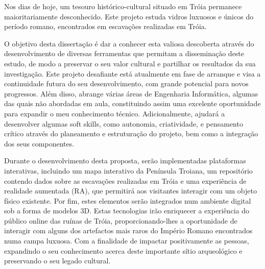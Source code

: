 
%

Nos dias de hoje, um tesouro histórico-cultural situado em Tróia permanece maioritariamente desconhecido.  
Este projeto estuda vidros luxuosos e únicos do período romano, encontrados em escavações realizadas em Tróia.


O objetivo desta dissertação é dar a conhecer esta valiosa descoberta através do desenvolvimento de diversas ferramentas que permitam a disseminação deste estudo, de modo a preservar o seu valor cultural e partilhar os resultados da sua investigação. 
Este projeto desafiante está atualmente em fase de arranque e visa a continuidade futura do seu desenvolvimento, com grande potencial para novos progressos.
Além disso, abrange várias áreas de Engenharia Informática, algumas das quais não abordadas em aula, constituindo assim uma excelente oportunidade para expandir o meu conhecimento técnico. 
Adicionalmente, ajudará a desenvolver algumas soft skills, como autonomia, criatividade, e pensamento crítico através do planeamento e estruturação do projeto, bem como a integração dos seus componentes. 


Durante o desenvolvimento desta proposta, serão implementadas plataformas interativas, incluindo um mapa interativo da Península Troiana, um repositório contendo dados sobre as escavações realizadas em Tróia e uma experiência de realidade aumentada (RA), que permitirá aos visitantes interagir com um objeto físico existente. 
Por fim, estes elementos serão integrados num ambiente digital sob a forma de modelos 3D.
Estas tecnologias irão enriquecer a experiência do público online das ruínas de Tróia, proporcionando-lhes a oportunidade de interagir com alguns dos artefactos mais raros do Império Romano encontrados numa campa luxuosa. 
Com a finalidade de impactar positivamente as pessoas, expandindo o seu conhecimento acerca deste importante sítio arqueológico e preservando o seu legado cultural.


